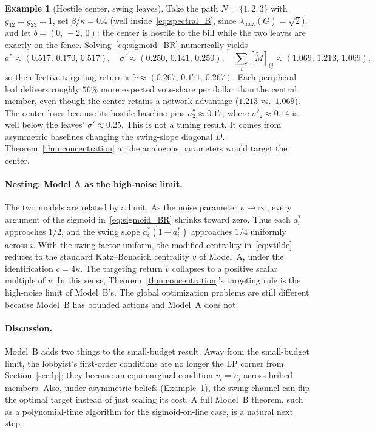 \documentclass[11pt,letterpaper]{article}
\theoremstyle{plain}
\theoremstyle{definition}
\newtheorem{example}{Example}
\theoremstyle{remark}
\begin{document}
\begin{example}[Hostile center, swing leaves]\label{ex:case4}
Take the path $N = \{1,2,3\}$ with $g_{12}=g_{23}=1$, set $\beta/\kappa = 0.4$ (well inside~\eqref{eq:spectral_B}, since $\lambda_{\max}(G) = \sqrt{2}$), and let $b = (0,\, -2,\, 0)$: the center is hostile to the bill while the two leaves are exactly on the fence. Solving~\eqref{eq:sigmoid_BR} numerically yields
\[
a^* \approx (0.517,\, 0.170,\, 0.517), \quad \sigma' \approx (0.250,\, 0.141,\, 0.250), \quad \textstyle\sum_i[\tilde M]_{ij} \approx (1.069,\, 1.213,\, 1.069),
\]
so the effective targeting return is $\tilde v \approx (0.267,\, 0.171,\, 0.267)$. Each peripheral leaf delivers roughly $56\%$ more expected vote-share per dollar than the central member, even though the center retains a network advantage ($1.213$ vs.\ $1.069$). The center loses because its hostile baseline pins $a_2^* \approx 0.17$, where $\sigma'_2 \approx 0.14$ is well below the leaves' $\sigma' \approx 0.25$. This is not a tuning result. It comes from asymmetric baselines changing the swing-slope diagonal $D$. Theorem~\ref{thm:concentration} at the analogous parameters would target the center.
\end{example}

\paragraph{Nesting: Model A as the high-noise limit.} The two models are related by a limit. As the noise parameter $\kappa \to \infty$, every argument of the sigmoid in~\eqref{eq:sigmoid_BR} shrinks toward zero. Thus each $a_i^*$ approaches $1/2$, and the swing slope $a_i^*(1 - a_i^*)$ approaches $1/4$ uniformly across $i$. With the swing factor uniform, the modified centrality in~\eqref{eq:vtilde} reduces to the standard Katz--Bonacich centrality $v$ of Model~A, under the identification $c = 4\kappa$. The targeting return $\tilde v$ collapses to a positive scalar multiple of $v$. In this sense, Theorem~\ref{thm:concentration}'s targeting rule is the high-noise limit of Model~B's. The global optimization problems are still different because Model~B has bounded actions and Model~A does not.

\paragraph{Discussion.} Model~B adds two things to the small-budget result. Away from the small-budget limit, the lobbyist's first-order conditions are no longer the LP corner from Section~\ref{sec:lp}; they become an equimarginal condition $\tilde v_i = \tilde v_j$ across bribed members. Also, under asymmetric beliefs (Example~\ref{ex:case4}), the swing channel can flip the optimal target instead of just scaling its cost. A full Model~B theorem, such as a polynomial-time algorithm for the sigmoid-on-line case, is a natural next step.
\end{document}
